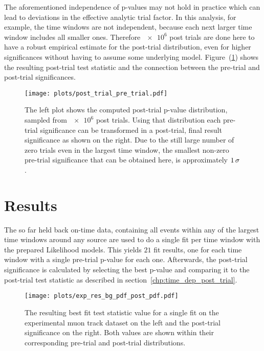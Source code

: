 The aforementioned independence of p-values may not hold in practice which can lead to deviations in the effective analytic trial factor.
In this analysis, for example, the time windows are not independent, because each next larger time window includes all smaller ones.
Therefore $\num{e6}$ post trials are done here to have a robust empirical estimate for the post-trial distribution, even for higher significances without having to assume some underlying model.
Figure~(\ref{fig:post_trial_pre_trial}) shows the resulting post-trial test statistic and the connection between the pre-trial and post-trial significances.

\begin{figure}[htbp]
  \centering
  \texttt{[image: plots/post\_trial\_pre\_trial.pdf]}
  \caption[Connection between pre-trial and post-trial significances]{
    The left plot shows the computed post-trial p-value distribution, sampled from $\num{e6}$ post trials.
    Using that distribution each pre-trial significance can be transformed in a post-trial, final result significance as shown on the right.
    Due to the still large number of zero trials even in the largest time window, the smallest non-zero pre-trial significance that can be obtained here, is approximately $\num{1}\,\sigma$.
  }
  \label{fig:post_trial_pre_trial}
\end{figure}


\section{Results}
The so far held back on-time data, containing all events within any of the largest time windows around any source are used to do a single fit per time window with the prepared Likelihood models.
This yields $\num{21}$ fit results, one for each time window with a single pre-trial p-value for each one.
Afterwards, the post-trial significance is calculated by selecting the best p-value and comparing it to the post-trial test statistic as described in section~\ref{chp:time_dep_post_trial}.

\begin{figure}[htbp]
  \centering
  \texttt{[image: plots/exp\_res\_bg\_pdf\_post\_pdf.pdf]}
  \caption[Experimental result for the time-dependent analysis]{
    The resulting best fit test statistic value for a single fit on the experimental muon track dataset on the left and the post-trial significance on the right.
    Both values are shown within their corresponding pre-trial and post-trial distributions.
  }
  \label{fig:tdep_exp_res_bg_pdf_post_pdf}
\end{figure}

